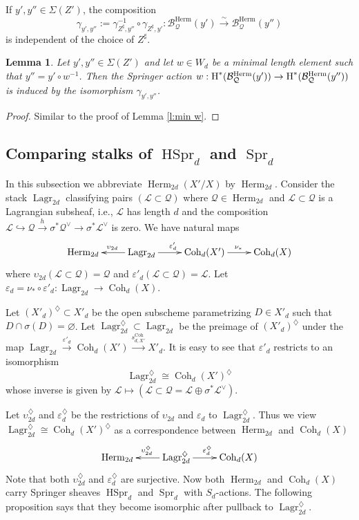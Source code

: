 \documentclass[reqno]{amsart}
\numberwithin{equation}{section}
\newcommand{\inj}{\hookrightarrow}
\DeclareMathOperator{\Herm}{Herm}
\DeclareMathOperator{\Lagr}{Lagr}
\DeclareMathOperator{\Coh}{Coh}
\DeclareMathOperator{\Spr}{Spr}
\DeclareMathOperator{\HSpr}{HSpr}
\newcommand\Sig{\Sigma}
\newcommand{\isom}{\stackrel{\sim}{\to}}
\newcommand\xr{\xrightarrow}
\newcommand\op{\oplus}
\renewcommand\c{\circ}
\newcommand\vn{\varnothing}
\newcommand{\cohog}[2]{\textup{H}^{#1}({#2})}     %
\newcommand\g\gamma
\newcommand{\e}{\varepsilon}
\newcommand{\s}{\sigma}
\newcommand\dm{\diamondsuit}
\newcommand\sh{\sharp}
\newcommand\cB{\mathcal{B}}
\newcommand\cL{\mathcal{L}}
\newcommand\cQ{\mathcal{Q}}
\newtheorem{lemma}[thm]{Lemma}
\theoremstyle{remark}
\numberwithin{equation}{section}
\begin{document}
If $y',y''\in \Sig(Z')$, the composition
\begin{equation*}
\g_{y',y''}:=\g_{Z^{\sh},y''}^{-1}\c\g_{Z^{\sh}, y'}:\cB^{\Herm}_{\cQ}(y')\isom\cB^{\Herm}_{\cQ}(y'')
\end{equation*}
is independent of the choice of $Z^{\sh}$.

\begin{lemma}\label{l:min w Herm}
Let $y',y''\in \Sig(Z')$ and let $w\in W_{d}$ be a minimal length element such that $y''=y'\c w^{-1}$. Then the Springer action $w: \cohog{*}{\cB^{\Herm}_{\cQ}(y')}\to  \cohog{*}{\cB^{\Herm}_{\cQ}(y'')}$ is induced by the isomorphism $\g_{y', y''}$.
\end{lemma}
\begin{proof}
Similar to the proof of Lemma \ref{l:min w}.
\end{proof}



\subsection{Comparing stalks of $\HSpr_{d}$ and $\Spr_{d}$}\label{ss:HSpr stalk}
In this subsection we abbreviate $\Herm_{2d}(X'/X)$ by $\Herm_{2d}$. Consider the stack $\Lagr_{2d}$ classifying pairs $(\cL\subset\cQ)$ where $\cQ\in\Herm_{2d}$ and $\cL\subset \cQ$ is a Lagrangian subsheaf, i.e., $\cL$ has length $d$ and the composition $\cL\inj \cQ\xr{h}\s^{*}\cQ^{\vee}\to \s^{*}\cL^{\vee}$ is zero. We have natural maps
\begin{equation*}
\xymatrix{\Herm_{2d} & \Lagr_{2d} \ar[l]_{\upsilon_{2d}}\ar[r]^{\e'_{d}}& \Coh_{d}(X')\ar[r]^{\nu_{*}} & \Coh_{d}(X)}
\end{equation*}
where $\upsilon_{2d}(\cL\subset\cQ)=\cQ$ and $\e'_{d}(\cL\subset\cQ)=\cL$.  Let $\e_{d}=\nu_{*}\c \e'_{d}: \Lagr_{2d}\to \Coh_{d}(X)$.
 
Let $(X'_{d})^{\dm}\subset X'_{d}$ be the open subscheme parametrizing $D\in X'_{d}$ such that $D\cap\s(D)=\vn$.  
Let $\Lagr^{\dm}_{2d}\subset \Lagr_{2d}$ be the preimage of $(X'_{d})^{\dm}$ under the map $\Lagr_{2d}\xr{\e'_{d}}\Coh_{d}(X')\xr{s^{\Coh}_{d,X'}} X'_{d}$.  It is easy to see that $\e'_{d}$ restricts to an isomorphism
\begin{equation*}
\Lagr^{\dm}_{2d}\cong \Coh_{d}(X')^{\dm}
\end{equation*}
whose inverse is given by $\cL\mapsto (\cL\subset \cQ=\cL\op \s^{*}\cL^{\vee})$. 

Let $\upsilon^{\dm}_{2d}$ and $\e^{\dm}_{d}$ be the restrictions of $\upsilon_{2d}$ and $\e_{d}$ to $\Lagr^{\dm}_{2d}$. Thus we view $\Lagr^{\dm}_{2d}\cong \Coh_{d}(X')^{\dm}$ as a correspondence between $\Herm_{2d}$ and $\Coh_{d}(X)$
\begin{equation*}
\xymatrix{ \Herm_{2d} &  \Lagr^{\dm}_{2d}\ar[l]_{\upsilon^{\dm}_{2d}}\ar[r]^{\e^{\dm}_{d}} &\Coh_{d}(X) }
\end{equation*}
Note that both $\upsilon^{\dm}_{2d}$ and $\e^{\dm}_{d}$ are surjective. Now both $\Herm_{2d}$ and $\Coh_{d}(X)$ carry Springer sheaves $\HSpr_{d}$ and $\Spr_{d}$ with $S_{d}$-actions. The following proposition says that they become isomorphic after pullback to $\Lagr^{\dm}_{2d}$.
\end{document}
